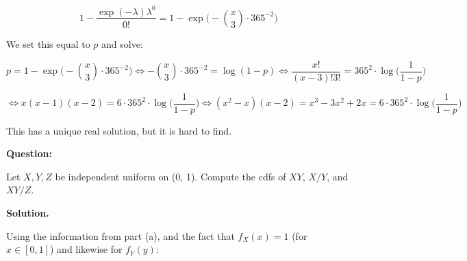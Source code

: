 \begin{enumerate}[(a)]
\[
1 - \frac{\exp(-\lambda) \lambda^0}{0!} = 1 - \exp \bigg(-\binom{x}{3} \cdot 365^{-2} \bigg)
\]

We set this equal to \(p\) and solve:

\[
p = 1 - \exp \bigg(-\binom{x}{3} \cdot 365^{-2} \bigg) \iff -\binom{x}{3} \cdot 365^{-2}  = \log(1-p) \iff \frac{x!}{(x-3)!3!} = 365^2 \cdot \log \bigg(\frac{1}{1-p} \bigg)
\]

\[
\iff x(x-1)(x-2) = 6 \cdot 365^2 \cdot \log \bigg(\frac{1}{1-p} \bigg) \iff (x^2-x)(x-2) =  x^3 - 3x^2 + 2x = 6 \cdot 365^2 \cdot \log \bigg(\frac{1}{1-p} \bigg) 
\]

This has a unique real solution, but it is hard to find.

\end{enumerate}



\textbf{Question:} 

Let \(X, Y, Z\) be independent uniform on (0, 1). Compute the cdfs of \(XY\), \(X/Y\), and \(XY/Z\). 

\textbf{Solution.}



Using the information from part (a), and the fact that \(f_X(x) = 1\) (for \(x \in [0, 1]\)) and likewise for \(f_Y(y)\):

